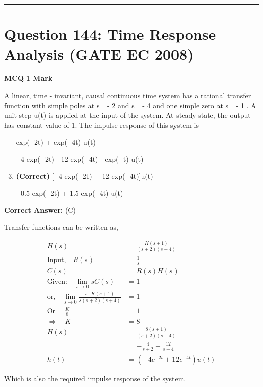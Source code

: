 \documentclass[11pt,a4paper]{article}
\begin{document}
\vspace{1.5em}
\hrule
\vspace{1.5em}

\section*{Question 144: Time Response Analysis (GATE EC 2008)}
\noindent \textbf{\color{primary}MCQ} \hfill \textbf{\color{secondary}1 Mark}


\noindent A linear, time - invariant, causal continuous time system has a rational transfer
function with simple poles at s =- 2 and s =- 4 and one simple zero at s =- 1
. A unit step u(t) is applied at the input of the system. At steady state, the
output has constant value of 1. The impulse response of this system is


\begin{enumerate}[label=(\Alph*)]
    \item [exp(- 2t) + exp(- 4t)]u(t)
    \item [- 4 exp(- 2t) - 12 exp(- 4t) - exp(- t)]u(t)
    \item \textbf{(Correct)} [- 4 exp(- 2t) + 12 exp(- 4t)]u(t)
    \item [- 0.5 exp(- 2t) + 1.5 exp(- 4t)]u(t)
\end{enumerate}

\noindent \textbf{Correct Answer:} (C)

\begin{tcolorbox}[solbox, title=Detailed Solution -- Question 144]
Transfer functions can be written as,

\[
\begin{aligned} H(s)&=\frac{K(s+1)}{(s+2)(s+4)} \\ \text{Input,}\quad R(s)&=\frac{1}{s}\\ C(s)&=R(s) H(s) \\ \text{Given:} \quad \lim _{s \rightarrow 0} s C(s)&=1 \\ \text{or,} \quad\lim _{s \rightarrow 0} \frac{s \cdot K(s+1)}{s(s+2)(s+4)}&=1 \\ \text{Or }\quad \frac{K}{8}&=1 \\ \Rightarrow \quad K &=8 \\ H(s) &=\frac{8(s+1)}{(s+2)(s+4)} \\ &=-\frac{4}{s+2}+\frac{12}{s+4} \\ h(t) &=\left(-4 e^{-2 t}+12 e^{-4 t}\right) u(t) \end{aligned}
\]

Which is also the required impulse response of the system.
\end{tcolorbox}
\end{document}
